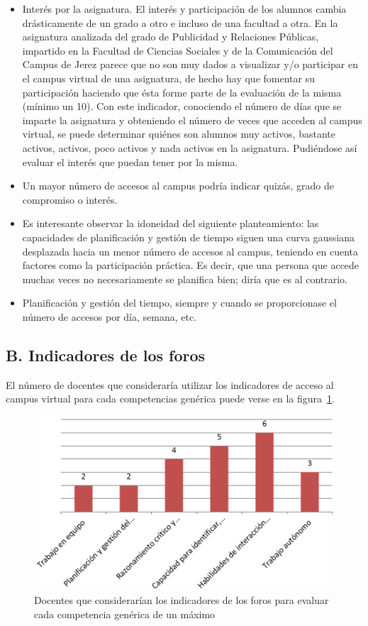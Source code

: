 \begin{itemize}
\item Interés por la asignatura. El interés y participación de los alumnos cambia drásticamente de un grado a otro e incluso de una facultad a otra. En la asignatura analizada del grado de Publicidad y Relaciones Públicas, impartido en la Facultad de Ciencias Sociales y de la Comunicación del Campus de Jerez parece que no son muy dados a visualizar y/o participar en el campus virtual de una asignatura, de hecho hay que fomentar su participación haciendo que ésta forme parte de la evaluación de la misma (mínimo un 10\percentage). Con este indicador, conociendo el número de días que se imparte la asignatura y obteniendo el número de veces que acceden al campus virtual, se puede determinar quiénes son alumnos muy activos, bastante activos, activos, poco activos y nada activos en la asignatura. Pudiéndose así evaluar el interés que puedan tener por la misma.
\item Un mayor número de accesos al campus podría indicar quizás, grado de compromiso o interés.
\item Es interesante observar la idoneidad del siguiente planteamiento: las capacidades de planificación y gestión de tiempo siguen una curva gaussiana desplazada hacia un menor número de accesos al campus, teniendo en cuenta factores como la participación práctica. Es decir, que una persona que accede muchas veces no necesariamente se planifica bien; diría que es al contrario.
\item Planificación y gestión del tiempo, siempre y cuando se proporcionase el número de accesos por día, semana, etc.
\end{itemize}

	\subsection*{B. Indicadores de los foros}

El número de docentes que consideraría utilizar los indicadores de acceso al campus virtual para cada competencias genérica puede verse en la figura~\ref{fig:ape:aa:foros}.

\begin{figure}[ht]
    \includegraphics[scale=0.4]{aa_foros.png}
  \caption{Docentes que considerarían los indicadores de los foros para evaluar cada competencia genérica de un máximo}
  \label{fig:ape:aa:foros}
\end{figure}

